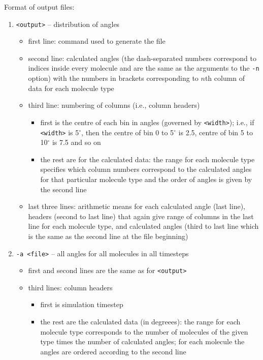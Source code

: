 \noindent
Format of output files:
\begin{enumerate}[nosep,leftmargin=20pt]
  \item \texttt{<output>} -- distribution of angles
    \begin{itemize}[nosep,leftmargin=5pt]
      \item first line: command used to generate the file
      \item second line: calculated angles (the dash-separated numbers
        correspond to indices inside every molecule and are the same as the
        arguments to the \texttt{-n} option) with the numbers in brackets
        corresponding to $n$th column of data for each molecule type
      \item third line: numbering of columns (i.e., column headers)
        \begin{itemize}[nosep,leftmargin=10pt]
          \item first is the centre of each bin in angles (governed by
            \texttt{<width>}); i.e., if \texttt{<width>} is 5$^{\circ}$,
            then the centre of bin 0 to 5$^{\circ}$ is 2.5, centre of bin 5
            to 10$^{\circ}$ is 7.5 and so on
          \item the rest are for the calculated data: the range for each
            molecule type specifies which column numbers correspond to the
            calculated angles for that particular molecule type and the
            order of angles is given by the second line
        \end{itemize}
      \item last three lines: arithmetic means for each calculated angle
        (last line), headers (second to last line) that again give range
        of columns in the last line for each molecule type, and calculated
        angles (third to last line which is the same as the second line at
        the file beginning)
    \end{itemize}
  \item \texttt{-a <file>} -- all angles for all molecules in all timesteps
  \begin{itemize}[nosep,leftmargin=5pt]
    \item first and second lines are the same as for \texttt{<output>}
    \item third lines: column headers
      \begin{itemize}[nosep,leftmargin=10pt]
        \item first is simulation timestep
        \item the rest are the calculated data (in degreees): the range for
          each molecule type corresponds to the number of molecules of the
          given type times the number of calculated angles; for each
          molecule the angles are ordered according to the second line
      \end{itemize}
  \end{itemize}
\end{enumerate}
